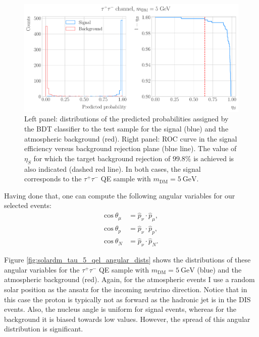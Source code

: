 \begin{figure}[t]
	\centering
	\includegraphics[width=0.95\linewidth]{Images/DM_Analysis/solardm_tau_5_qel_bdt_classifier.pdf}
	\caption[Performance of the BDT classifier for the $\tau^{+}\tau^{-}$ QE signal with $m_{\mathrm{DM}} = 5 \ \mathrm{GeV}$.]{Left panel: distributions of the predicted probabilities assigned by the BDT classifier to the test sample for the signal (blue) and the atmospheric background (red). Right panel: ROC curve in the signal efficiency versus background rejection plane (blue line). The value of $\eta_{S}$ for which the target background rejection of $99.8\%$ is achieved is also indicated (dashed red line). In both cases, the signal corresponds to the $\tau^{+}\tau^{-}$ QE sample with $m_{\mathrm{DM}} = 5 \ \mathrm{GeV}$.}
	\label{fig:solardm_tau_5_qel_classifier}
\end{figure}

Having done that, one can compute the following angular variables for our selected events:
\begin{align}
	\mathrm{cos} \ \theta_{\mu} &= \hat{p}_{\nu} \cdot \hat{p}_{\mu},\label{6.8} \\
	\mathrm{cos} \ \theta_{p} &= \hat{p}_{\nu} \cdot \hat{p}_{p},\label{6.9} \\
	\mathrm{cos} \ \theta_{N} &= \hat{p}_{\nu} \cdot \hat{p}_{N}. \label{6.10}
\end{align}

Figure \ref{fig:solardm_tau_5_qel_angular_dists} shows the distributions of these angular variables for the $\tau^{+}\tau^{-}$ QE sample with $m_{\mathrm{DM}} = 5 \ \mathrm{GeV}$ (blue) and the atmospheric background (red). Again, for the atmospheric events I use a random solar position as the ansatz for the incoming neutrino direction. Notice that in this case the proton is typically not as forward as the hadronic jet is in the DIS events. Also, the nucleus angle is uniform for signal events, whereas for the background it is biased towards low values. However, the spread of this angular distribution is significant.

